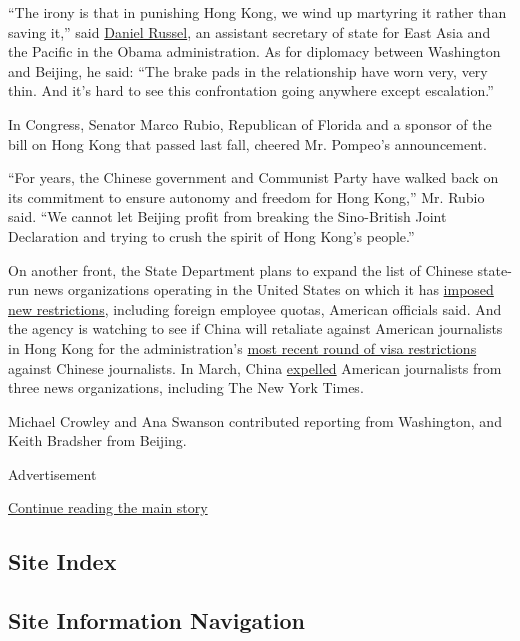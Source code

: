 ``The irony is that in punishing Hong Kong, we wind up martyring it
rather than saving it,'' said
\href{https://asiasociety.org/policy-institute/daniel-russel}{Daniel
Russel}, an assistant secretary of state for East Asia and the Pacific
in the Obama administration. As for diplomacy between Washington and
Beijing, he said: ``The brake pads in the relationship have worn very,
very thin. And it's hard to see this confrontation going anywhere except
escalation.''

In Congress, Senator Marco Rubio, Republican of Florida and a sponsor of
the bill on Hong Kong that passed last fall, cheered Mr. Pompeo's
announcement.

``For years, the Chinese government and Communist Party have walked back
on its commitment to ensure autonomy and freedom for Hong Kong,'' Mr.
Rubio said. ``We cannot let Beijing profit from breaking the
Sino-British Joint Declaration and trying to crush the spirit of Hong
Kong's people.''

On another front, the State Department plans to expand the list of
Chinese state-run news organizations operating in the United States on
which it has
\href{https://www.nytimes3xbfgragh.onion/2020/03/26/us/politics/coronavirus-china-spies.html}{imposed
new restrictions}, including foreign employee quotas, American officials
said. And the agency is watching to see if China will retaliate against
American journalists in Hong Kong for the administration's
\href{https://www.nytimes3xbfgragh.onion/2020/05/09/us/politics/china-journalists-us-visa-crackdown.html}{most
recent round of visa restrictions} against Chinese journalists. In
March, China
\href{https://www.nytimes3xbfgragh.onion/2020/03/17/business/media/china-expels-american-journalists.html}{expelled}
American journalists from three news organizations, including The New
York Times.

Michael Crowley and Ana Swanson contributed reporting from Washington,
and Keith Bradsher from Beijing.

Advertisement

\protect\hyperlink{after-bottom}{Continue reading the main story}

\hypertarget{site-index}{%
\subsection{Site Index}\label{site-index}}

\hypertarget{site-information-navigation}{%
\subsection{Site Information
Navigation}\label{site-information-navigation}}

